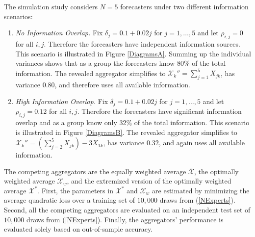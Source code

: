 \documentclass[11pt]{article}
\theoremstyle{definition}
\theoremstyle{definition}
\begin{document}
The simulation study considers $N = 5$ forecasters under two different information scenarios: 
\begin{enumerate}
\item[] \textit{No Information Overlap.}  Fix $\delta_j = 0.1 + 0.02j$ for $j = 1, \dots, 5$ and let $\rho_{i,j} = 0$ for all $i,j$. Therefore the forecasters have independent information sources. This scenario is illustrated in Figure \ref{DiagramsA}. Summing up the individual variances shows that as a group the forecasters know $80\%$ of the total information. The revealed aggregator simplifies to $\mathcal{X}_k'' = \sum_{j=1}^5 X_{jk}$, has variance $0.80$, and therefore uses all available information.


\item[] \textit{High Information Overlap.} Fix $\delta_j = 0.1 + 0.02j$ for $j = 1, \dots, 5$ and let $\rho_{i,j} = 0.12$ for all $i,j$. Therefore the forecasters have significant information overlap and as a group know only $32\%$ of the total information. This scenario is illustrated in Figure \ref{DiagramsB}. The revealed aggregator simplifies to $ \mathcal{X}_k'' = \left( \sum_{j=2}^5 X_{jk} \right) - 3X_{1k}$, has variance $0.32$, and again uses all available information.
\end{enumerate}


The competing aggregators are the equally weighted average $\bar{\mathcal{X}}$, the optimally weighted average $\mathcal{X}_w$, and the extremized version of the optimally weighted average $\mathcal{X}^*$. First, the parameters in $\mathcal{X}^*$ and  $\mathcal{X}_w$ are estimated by minimizing the average quadratic loss over a training set of $10,000$ draws from (\ref{NExperts}).  Second, all the competing aggregators are evaluated on an independent test set of $10,000$ draws from (\ref{NExperts}). Finally,  the aggregators' performance is evaluated solely based on out-of-sample accuracy.

\end{document}
